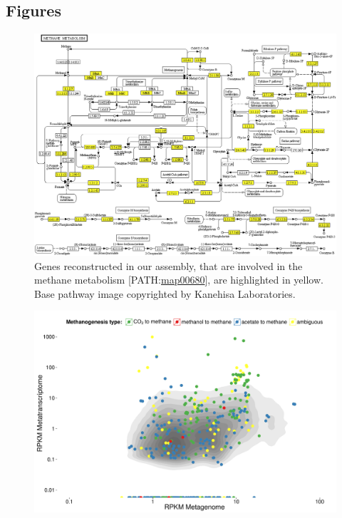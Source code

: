 \documentclass{bmcart}
\begin{document}
\begin{backmatter}


\section*{Figures}
\begin{figure}[h!]
\centering
\includegraphics[width=.9\textwidth]{map00680_cropped}
\caption{ Genes reconstructed in our assembly, that are involved in the methane metabolism [PATH:\href{http://www.genome.jp/kegg-bin/show_pathway?map00680}{map00680}], are highlighted in yellow.
Base pathway image copyrighted by Kanehisa Laboratories.}
\label{fPathway}
\end{figure}
\begin{figure}[h!]
\centering
\includegraphics[width=.9\textwidth]{Rplot}

\end{figure}
\end{backmatter}
\end{document}
